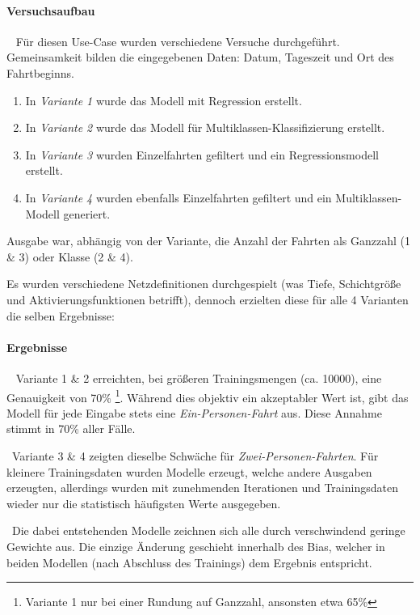 \paragraph{Versuchsaufbau} ~\newline
Für diesen Use-Case wurden verschiedene Versuche durchgeführt. Gemeinsamkeit bilden die eingegebenen Daten: Datum, Tageszeit und Ort des Fahrtbeginns. 
\begin{enumerate}
	\item In \textit{Variante 1} wurde das Modell mit Regression erstellt. 
	\item In \textit{Variante 2} wurde das Modell für Multiklassen-Klassifizierung erstellt.
	\item In \textit{Variante 3} wurden Einzelfahrten gefiltert und ein Regressionsmodell erstellt. 
	\item In \textit{Variante 4} wurden ebenfalls Einzelfahrten gefiltert und ein Multiklassen-Modell generiert. 
\end{enumerate}
Ausgabe war, abhängig von der Variante, die Anzahl der Fahrten als Ganzzahl (1 \& 3) oder Klasse (2 \& 4). 

Es wurden verschiedene Netzdefinitionen durchgespielt (was Tiefe, Schichtgröße und Aktivierungsfunktionen betrifft), dennoch erzielten diese für alle 4 Varianten die selben Ergebnisse:
\paragraph{Ergebnisse} ~\newline
Variante 1 \& 2 erreichten, bei größeren Trainingsmengen (ca. 10000), eine Genauigkeit von 70\% \footnote{Variante 1 nur bei einer Rundung auf Ganzzahl, ansonsten etwa 65\%}. Während dies objektiv ein akzeptabler Wert ist, gibt das Modell für jede Eingabe stets eine \textit{Ein-Personen-Fahrt} aus. Diese Annahme stimmt in 70\% aller Fälle. 

~\newline Variante 3 \& 4 zeigten dieselbe Schwäche für \textit{Zwei-Personen-Fahrten}. Für kleinere Trainingsdaten wurden Modelle erzeugt, welche andere Ausgaben erzeugten, allerdings wurden mit zunehmenden Iterationen und Trainingsdaten wieder nur die statistisch häufigsten Werte ausgegeben. 

~\newline Die dabei entstehenden Modelle zeichnen sich alle durch verschwindend geringe Gewichte aus. Die einzige Änderung geschieht innerhalb des Bias, welcher in beiden Modellen (nach Abschluss des Trainings) dem Ergebnis entspricht.

